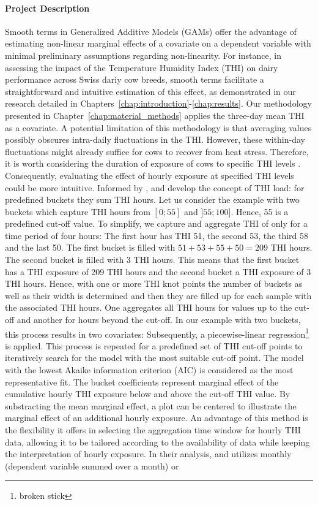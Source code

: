 \paragraph{Project Description} Smooth terms in Generalized Additive Models (GAMs) offer the advantage of estimating non-linear marginal effects of a covariate on a dependent variable with minimal preliminary assumptions regarding non-linearity. For instance, in assessing the impact of the Temperature Humidity Index (THI) on dairy performance across Swiss dariy cow breeds, smooth terms facilitate a straightforward and intuitive estimation of this effect, as demonstrated in our research detailed in Chapters~\ref{chap:introduction}-\ref{chap:results}. Our methodology presented in Chapter~\ref{chap:material_methods} applies the three-day mean THI as a covariate. A potential limitation of this methodology is that averaging values possibly obscures intra-daily fluctuations in the THI. However, these within-day fluctuations might already suffice for cows to recover from heat stress. Therefore, it is worth considering the duration of exposure of cows to specific THI levels \citep{kadzere_heat_2002}. Consequently, evaluating the effect of hourly exposure at specified THI levels could be more intuitive. Informed by \citet{schlenker_nonlinear_2009}, \cite{bucheli_heat_2022} and \cite{vroege_effects_2023} develop the concept of THI load: for predefined buckets they sum THI hours. Let us consider the example with two buckets which capture THI hours from $[0;55]$ and $]55;100]$. Hence, 55 is a predefined cut-off value. To simplify, we capture and aggregate THI of only for a time period of four hours: The first hour has THI 51, the second 53, the third 58 and the last 50. The first bucket is filled with $51+53+55+50=209$ THI hours. The second bucket is filled with $3$ THI hours. This means that the first bucket has a THI exposure of 209 THI hours and the second bucket a THI exposure of 3 THI hours. Hence, with one or more THI knot points the number of buckets as well as their width is determined and then they are filled up for each sample with the associated THI hours. One aggregates all THI hours for values up to the cut-off and another for hours beyond the cut-off. In our example with two buckets, this process results in two covariates: Subsequently, a piecewise-linear regression\footnote{broken stick} is applied. This process is repeated for a predefined set of THI cut-off points to iteratively search for the model with the most suitable cut-off point. The model with the lowest Akaike information criterion (AIC) is considered as the most representative fit. The bucket coefficients represent marginal effect of the cumulative hourly THI exposure below and above the cut-off THI value. By substracting the mean marginal effect, a plot can be centered to illustrate the marginal effect of an additional hourly exposure. An advantage of this method is the flexibility it offers in selecting the aggregation time window for hourly THI data, allowing it to be tailored according to the availability of data while keeping the interpretation of hourly exposure. In their analysis, \cite{vroege_effects_2023} and \cite{bucheli_heat_2022} utilizes monthly (dependent variable summed over a month) or 